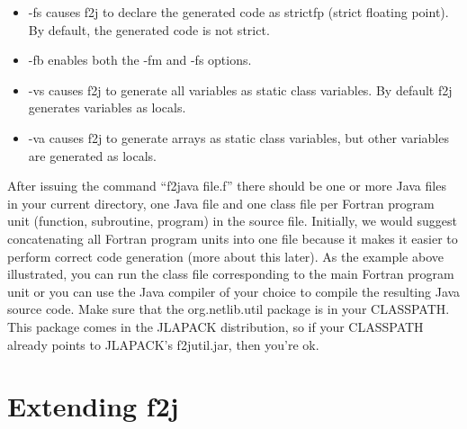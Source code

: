 \documentclass[11pt]{article}
\begin{document}
\begin{itemize}
\item -fs causes f2j to declare the generated code as strictfp (strict
  floating point).  By default, the generated code is not strict.

\item -fb enables both the -fm and -fs options.

\item -vs causes f2j to generate all variables as static class
  variables.  By default f2j generates variables as locals.

\item -va causes f2j to generate arrays as static class variables, but
  other variables are generated as locals.
\end{itemize}

After issuing the command ``f2java file.f'' there should be one or more Java
files in your current directory, one Java file and one class file per Fortran program unit
(function, subroutine, program) in the source file.  Initially, we would
suggest concatenating all Fortran program units into one file because it makes
it easier to perform correct code generation (more about this later).  As the
example above illustrated, you can run the class file corresponding to the main
Fortran program unit or you can use the Java compiler of your choice to compile
the resulting Java source code.  Make sure that the org.netlib.util package is
in your CLASSPATH.  This package comes in the JLAPACK distribution, so if your
CLASSPATH already points to JLAPACK's f2jutil.jar, then you're ok.

\section{Extending f2j}
\end{document}
